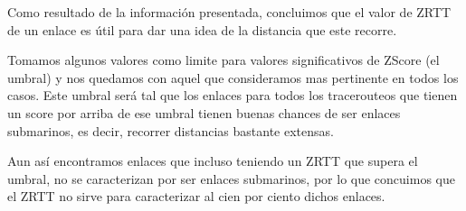 ﻿Como resultado de la información presentada, concluimos que el valor de ZRTT de un enlace es útil para dar una idea de la distancia que este recorre. 

Tomamos algunos valores como limite para valores significativos de ZScore (el umbral) y nos quedamos con aquel que consideramos mas pertinente en todos los casos. Este umbral ser\'a tal que los enlaces para todos los tracerouteos que tienen un score por arriba de ese umbral tienen buenas chances de ser enlaces submarinos, es decir, recorrer distancias bastante extensas.

Aun as\'i encontramos enlaces que incluso teniendo un ZRTT que supera el umbral, no se caracterizan por ser enlaces submarinos, por lo que concuimos que el ZRTT no sirve para caracterizar al cien por ciento dichos enlaces.

